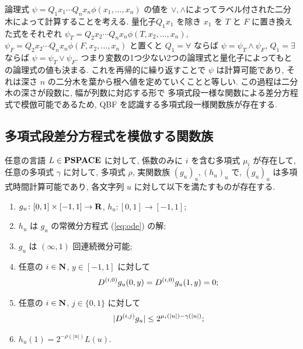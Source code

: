 論理式 $\psi = Q_1 x_1 \cdots Q_n x_n \phi(x_1, \dots, x_n)$ の値を
$\vee, \wedge$によってラベル付された二分木によって計算することを考える. 
量化子$Q_1 x_1$ を除き $x_1$ を $T$ と $F$ に置き換えた式をそれぞれ
$\psi_T = Q_2 x_2 \cdots Q_n x_n \phi(T, x_2, \dots, x_n)$,
$\psi_F = Q_2 x_2 \cdots Q_n x_n \phi(F, x_2, \dots, x_n)$ と置くと
$Q_1=\forall$ ならば $\psi = \psi_T \wedge \psi_F$, 
$Q_1=\exists$ ならば $\psi = \psi_T \vee \psi_F$.
つまり変数の1つ少ない2つの論理式と量化子によってもとの論理式の値も決まる.
これを再帰的に繰り返すことで $\psi$ は計算可能であり, 
それは深さ $n$ の二分木を葉から根へ値を定めていくことと等しい.
この過程は二分木の深さが段数に, 幅が列数に対応する形で
多項式段一様な関数による差分方程式で模倣可能であるため,
\textsf{QBF} を認識する多項式段一様関数族が存在する.



\subsection{多項式段差分方程式を模倣する関数族}


\begin{lemma}
 \label{DifferentiableFamily}
 任意の言語 $L \in \mathbf{PSPACE}$ に対して, 
 係数のみに $i$ を含む多項式 $\mu_i$ が存在して,
 任意の多項式 $\gamma$ に対して,
 多項式 $\rho$, 実関数族 $(g_u)_u, (h_u)_u$ で, 
 $(g_u)_u$ は多項式時間計算可能であり,
 各文字列 $u$ に対して以下を満たすものが存在する.
 \begin{enumerate}
  \item $g_u\colon [0,1] \times [-1,1]\to \mathbf R$, $h_u\colon [0,1] \to [-1,1]$;
  \item $h_u$ は $g_u$ の常微分方程式 (\ref{eq:ode}) の解; 
  \item $g_u$ は $(\infty, 1)$ 回連続微分可能;
  \item 任意の $i \in \mathbf N$, $y \in [-1,1]$ に対して
	\begin{equation*}
	 D ^{(i, 0)} g_u(0,y) = D ^{(i, 0)} g_u(1,y) = 0;
	\end{equation*}
  \item \label{enum:infty1}
	任意の $i \in \mathbf N$, $j \in \{0,1\}$ に対して
	\begin{equation*}
	 |D ^{(i,j)} g_u| \leq 2^{\mu_i (|u|) - \gamma(|u|)};
	\end{equation*}
  \item $h_u(1) = 2^{-\rho(|u|)}L(u)$.
 \end{enumerate}
\end{lemma}

